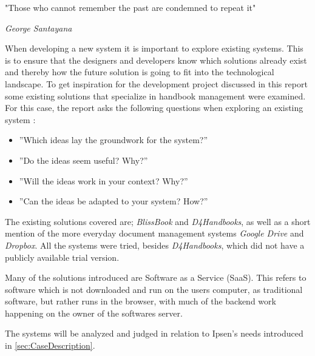 \epigraph{"Those who cannot remember the past are condemned to repeat it"}{\textit{George Santayana}}
When developing a new system it is important to explore existing systems.
This is to ensure that the designers and developers know which solutions already exist and thereby how the future solution is going to fit into the technological landscape.
To get inspiration for the development project discussed in this report some existing solutions that specialize in handbook management were examined.
For this case, the report asks the following questions when exploring an existing system \citep[p.~33]{Rod-Aalborg}:

\begin{itemize}
  \item ''Which ideas lay the groundwork for the system?''
  \item ''Do the ideas seem useful? Why?''
  \item ''Will the ideas work in your context? Why?''
  \item ''Can the ideas be adapted to your system? How?''
\end{itemize}

The existing solutions covered are; \textit{BlissBook} and \textit{D4Handbooks}, as well as a short mention of the more everyday document management systems \textit{Google Drive} and \textit{Dropbox}.
All the systems were tried, besides \textit{D4Handbooks}, which did not have a publicly available trial version.

Many of the solutions introduced are Software as a Service (SaaS).
This refers to software which is not downloaded and run on the users computer, as traditional software, but rather runs in the browser, with much of the backend work happening on the owner of the softwares server.

The systems will be analyzed and judged in relation to Ipsen's needs introduced in \cref{sec:CaseDescription}.
